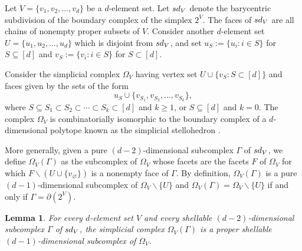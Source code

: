 \documentclass[11pt]{amsart}
\theoremstyle{theorems}
\newtheorem{lemma}[theorem]{Lemma}
\theoremstyle{definition}
\newcommand{\sd}{{\rm sd}}
\newcommand{\sm}{{\smallsetminus}}
\begin{document}
Let $V = \{v_1, v_2,\dots,v_d\}$ be a $d$-element set. Let $\sd_V$ 
denote the barycentric subdivision of the boundary complex of the 
simplex $2^V$. The faces of $\sd_V$ are all chains of nonempty 
proper subsets of $V$. Consider another $d$-element set 
$U = \{u_1,u_2,\ldots,u_d\}$ which is disjoint from $\sd_V$, and 
set $u_S := \{ u_i : i \in S \}$ for $S \subseteq [d]$ and 
$v_S := \{ v_i : i \in S \}$ for $S \subset [d]$.

Consider the simplicial complex $\Omega_V$ having vertex set 
$U \cup \{ v_S : S \subset [d] \}$ and faces given by the sets of 
the form 
%
\[ u_S \cup \{ v_{S_1}, v_{S_2},\dots,v_{S_k} \}, \]
%
where $S \subseteq S_1 \subset S_2 \subset \cdots \subset S_k 
\subset [d]$ and $k \ge 1$, or $S \subseteq [d]$ and $k = 0$. The 
complex $\Omega_V$ is combinatorially isomorphic to the boundary 
complex of a $d$-dimensional polytope known as the simplicial 
stellohedron \cite[Example~5]{BKR22} \cite[Section~10.4]{PRW08}.

More generally, given a pure $(d-2)$-dimensional subcomplex 
$\Gamma$ of $\sd_V$, we define $\Omega_V(\Gamma)$ as the 
subcomplex of $\Omega_V$ whose facets are the facets $F$ of 
$\Omega_V$ for which $F \sm (U \cup \{ v_\varnothing \})$ is a 
nonempty face of $\Gamma$. By definition, $\Omega_V(\Gamma)$ 
is a pure $(d-1)$-dimensional subcomplex of $\Omega_V \sm \{U\}$ 
and $\Omega_V(\Gamma) = \Omega_V \sm \{U\}$ if and only if 
$\Gamma = \partial(2^V)$. 

\begin{lemma} \label{lem:shellability-a}
For every $d$-element set $V$ and every shellable 
$(d-2)$-dimensional subcomplex $\Gamma$ of $\sd_V$, the 
simplicial complex $\Omega_V(\Gamma)$ is a proper shellable 
$(d-1)$-dimensional subcomplex of $\Omega_V$.
\end{lemma}
\end{document}
